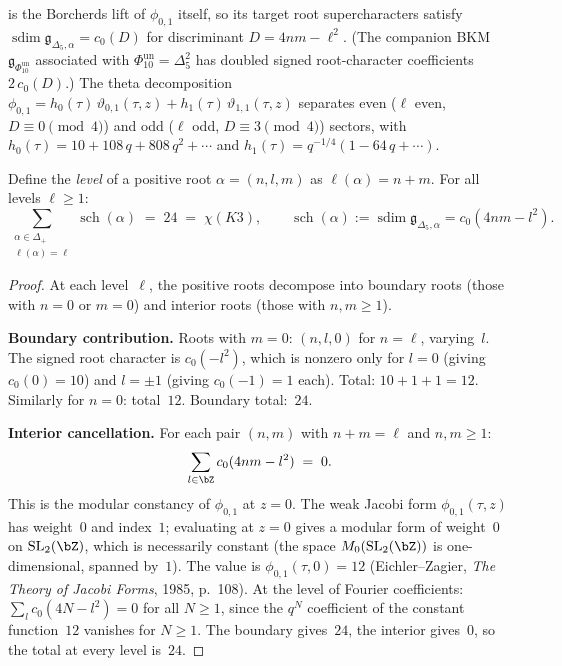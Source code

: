 \begin{proposition}
is the Borcherds lift of $\phi_{0,1}$ itself, so its target root
supercharacters satisfy
\(\operatorname{sdim}\mathfrak g_{\Delta_5,\alpha} = c_0(D)\) for
discriminant $D = 4nm - \ell^2$. \textup{(}The companion BKM
\(\mathfrak{g}_{\Phi_{10}^{\mathrm{un}}}\) associated with
\(\Phi_{10}^{\mathrm{un}} = \Delta_5^2\)
has doubled signed root-character coefficients $2\,c_0(D)$.\textup{)}
The theta decomposition
$\phi_{0,1} = h_0(\tau)\,\vartheta_{0,1}(\tau,z)
+ h_1(\tau)\,\vartheta_{1,1}(\tau,z)$ separates even
($\ell$ even, $D \equiv 0 \pmod{4}$) and odd
($\ell$ odd, $D \equiv 3 \pmod{4}$) sectors, with
$h_0(\tau) = 10 + 108\,q + 808\,q^2 + \cdots$ and
$h_1(\tau) = q^{-1/4}(1 - 64\,q + \cdots)$.
\end{proposition}

\begin{proposition}
\label{prop:root-mult-constancy}
Define the \emph{level} of a positive root $\alpha = (n, l, m)$ as
$\ell(\alpha) = n + m$. For all levels $\ell \geq 1$:
\[
 \sum_{\substack{\alpha \in \Delta_+ \\ \ell(\alpha) = \ell}}
 \operatorname{sch}(\alpha) \;=\; 24 \;=\; \chi(K3),
 \qquad
 \operatorname{sch}(\alpha)
 := \operatorname{sdim}\mathfrak g_{\Delta_5,\alpha}
 = c_0(4nm-l^2).
\]
\end{proposition}

\begin{proof}
At each level~$\ell$, the positive roots decompose into boundary
roots (those with $n = 0$ or $m = 0$) and interior roots (those
with $n, m \geq 1$).

\medskip\noindent\textbf{Boundary contribution.}
Roots with $m = 0$: $(n, l, 0)$ for $n = \ell$, varying~$l$.
The signed root character is $c_0(-l^2)$, which is nonzero only for
$l = 0$ (giving $c_0(0) = 10$) and $l = \pm 1$ (giving
$c_0(-1) = 1$ each). Total: $10 + 1 + 1 = 12$.
Similarly for $n = 0$: total~$12$. Boundary total:~$24$.

\medskip\noindent\textbf{Interior cancellation.}
For each pair $(n, m)$ with $n + m = \ell$ and $n, m \geq 1$:
\[
 \sum_{l \in \bZ} c_0(4nm - l^2) \;=\; 0.
\]
This is the modular constancy of $\phi_{0,1}$ at $z = 0$.
The weak Jacobi form $\phi_{0,1}(\tau, z)$ has weight~$0$ and
index~$1$; evaluating at $z = 0$ gives a modular form of
weight~$0$ on $\mathrm{SL}_2(\bZ)$, which is necessarily constant
(the space $M_0(\mathrm{SL}_2(\bZ))$ is one-dimensional, spanned
by~$1$). The value is $\phi_{0,1}(\tau, 0) = 12$
(Eichler--Zagier, \emph{The Theory of Jacobi Forms}, 1985, p.~108).
At the level of Fourier coefficients:
$\sum_l c_0(4N - l^2) = 0$ for all $N \geq 1$, since the $q^N$
coefficient of the constant function~$12$ vanishes for $N \geq 1$.
The boundary gives~$24$, the interior gives~$0$, so the total at
every level is~$24$.
\end{proof}

